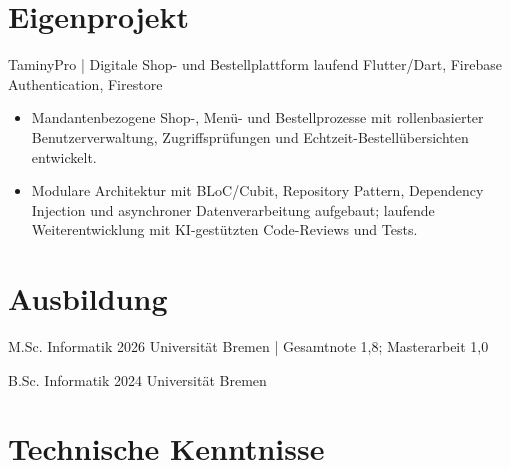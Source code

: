 \section{Eigenprojekt}

\cvitem
{TaminyPro | Digitale Shop- und Bestellplattform}
{laufend}
{Flutter/Dart, Firebase Authentication, Firestore}

\begin{itemize}

    \item Mandantenbezogene Shop-, Menü- und
    Bestellprozesse mit rollenbasierter
    Benutzerverwaltung, Zugriffsprüfungen
    und Echtzeit-Bestellübersichten entwickelt.

    \item Modulare Architektur mit
    BLoC/Cubit, Repository Pattern,
    Dependency Injection und asynchroner
    Datenverarbeitung aufgebaut;
    laufende Weiterentwicklung mit
    KI-gestützten Code-Reviews und Tests.

\end{itemize}


\section{Ausbildung}

\cvitem
{M.Sc. Informatik}
{2026}
{Universität Bremen | Gesamtnote 1,8;
Masterarbeit 1,0}

\cvitem
{B.Sc. Informatik}
{2024}
{Universität Bremen}


\section{Technische Kenntnisse}

\begingroup

\setlength{\tabcolsep}{0pt}
\renewcommand{\arraystretch}{1.12}

